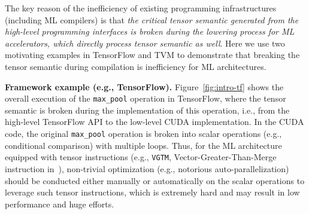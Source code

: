 The key reason of the inefficiency of existing programming infrastructures (including ML compilers) is that \emph{the critical tensor semantic generated from the high-level programming interfaces is broken during the lowering process for ML accelerators, which directly process tensor semantic as well}. Here we use two motivating examples in TensorFlow and TVM to demonstrate that breaking the tensor semantic during compilation is inefficiency for ML architectures.



\textbf{Framework example (e.g., TensorFlow).} Figure~\ref{fig:intro-tf} shows the overall execution of the \texttt{max\_pool} operation in TensorFlow, where the tensor semantic is broken during the implementation of this operation, i.e., from the high-level TensorFlow API to the low-level CUDA implementation. In the CUDA code, the original \texttt{max\_pool} operation is broken into scalar operations (e.g., conditional comparison) with multiple loops. Thus, for the ML architecture equipped with tensor instructions (e.g., \texttt{VGTM}, Vector-Greater-Than-Merge instruction in~\cite{liu2016cambricon,chen2019instruction}), non-trivial optimization (e.g., notorious auto-parallelization) should be conducted either manually or automatically on the scalar operations to leverage such tensor instructions, which is extremely hard and may result in low performance and huge efforts.


